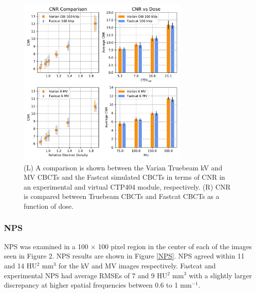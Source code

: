 \begin{figure}[ht!]
  \begin{center}
  \includegraphics[width=0.75\textwidth, clip]{figures/CNR_dose.pdf}
  \caption{
  (L) A comparison is shown between the Varian Truebeam kV and MV CBCTs and the Fastcat simulated CBCTs in terms of CNR in an experimental and virtual CTP404 module, respectively. (R) CNR is compared between Truebeam CBCTs and Fastcat CBCTs as a function of dose. \label{CNR} 
    }  %
    \end{center}
\end{figure}

\subsubsection{NPS}

NPS was examined in a 100 $\times$ 100 pixel region in the center of each of the images seen in Figure 2. NPS results are shown in Figure \ref{NPS}. NPS agreed within 11 and 14 HU$^2$ mm$^3$ for the kV and MV images respectively. Fastcat and experimental NPS had average RMSEs of 7 and 9 HU$^2$ mm$^3$ with a slightly larger discrepancy at higher spatial frequencies between 0.6 to 1 mm$^{-1}$.

